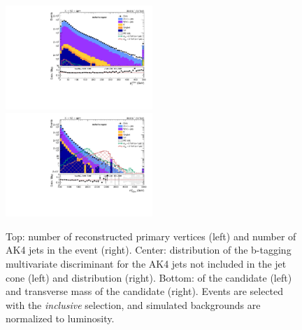 \begin{figure}[!htb]
\begin{center}
    \includegraphics[width=0.495\textwidth]{plots/v9_thesis/XVZnnInc/X_pt.pdf}
    \includegraphics[width=0.495\textwidth]{plots/v9_thesis/XVZnnInc/X_tmass.pdf}

    \caption{Top: number of reconstructed primary vertices (left) and number of AK4 jets in the event (right). Center: distribution of the b-tagging multivariate discriminant for the AK4 jets not included in the \V jet cone (left) and \MET distribution (right). Bottom: \pt of the \VZ candidate (left) and transverse mass of the \VZ candidate (right). Events are selected with the \emph{inclusive} selection, and simulated backgrounds are normalized to luminosity.}
  \end{center}
\end{figure}

\clearpage


